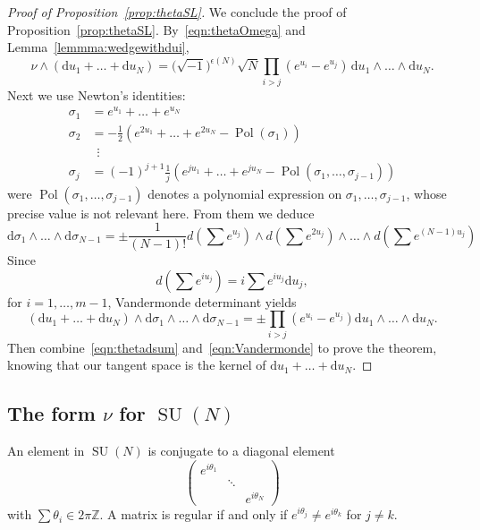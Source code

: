 \documentclass[11pt]{article}
\theoremstyle{definition}
\numberwithin{equation}{section}
\numberwithin{figure}{section}
\numberwithin{table}{section}
\DeclareMathOperator{\SU}{SU}
\DeclareMathOperator{\Pol}{Pol}
\newcommand{\Zbb}{\mathbb{Z}}
\newcommand*{\dd}{\mathrm{d}}
\newcommand{\SUn}{\SU(N)}
\begin{document}
\begin{proof}[Proof of Proposition~\ref{prop:thetaSL}]
We conclude the proof of Proposition~\ref{prop:thetaSL}. By~\eqref{eqn:thetaOmega} and Lemma~\ref{lemmma:wedgewithdui},
\begin{equation}\label{eqn:thetadsum}
\nu\wedge (\dd u_1+\dots + \dd u_N)= \big(\sqrt{-1}\big)^{\epsilon(N)}\sqrt{N} \prod_{i> j}(e^{u_i}-e^{u_j})\, \dd u_1\wedge \dots \wedge \dd u_N.
\end{equation}
Next we use Newton's identities:
\begin{align*}
\sigma_1 & = e^{u_1}+ \dots + e^{u_N} \\
\sigma_2 & = -\tfrac{1}{2} (e^{2 u_1}+ \dots + e^{2 u_N} -\Pol(\sigma_1)) \\
&\;\:\vdots \\
\sigma_j & = (-1)^{j+1}\tfrac{1}{j} (e^{j u_1}+ \dots + e^{j u_N} -\Pol(\sigma_1,\dots,\sigma_{j-1}))
\end{align*}
were $ \Pol(\sigma_1,\dots,\sigma_{j-1})$ denotes a polynomial expression on $\sigma_1,\dots,\sigma_{j-1}$, whose precise value is not relevant here. From them we deduce
\[
\dd\sigma_1\wedge\dots\wedge \dd\sigma_{N-1}= \pm \frac{1}{(N-1)!}d (\sum e^{u_j}) \wedge d (\sum e^{2 u_j})\wedge \dots
\wedge d (\sum e^{(N-1)u_j})
\]
Since
\[
d (\sum e^{i u_j}) = i \sum e^{i u_j}\dd u_ j,
\]
for $i=1,\dots, m-1$, Vandermonde determinant yields
\begin{equation}\label{eqn:Vandermonde}
(\dd u_1+\dots + \dd u_N) \wedge \dd\sigma_1\wedge\dots\wedge \dd\sigma_{N-1} =
\pm \prod_{i>j} (e^{u_i}-e^{u_j}) \dd u_1\wedge \dots \wedge \dd u_N.
\end{equation}
Then combine~\eqref{eqn:thetadsum} and~\eqref{eqn:Vandermonde} to prove the theorem, knowing that our tangent space is the kernel of $ \dd u_1+\dots + \dd u_N $.
\end{proof}


\subsection{The form \texorpdfstring{$\nu$}{nu} for \texorpdfstring{$\SUn$}{SUn}}

An element in $\SUn$ is conjugate to a diagonal element
\[
\begin{pmatrix}
e^{i\theta_1} & & \\
& \ddots & \\
& & e^{i\theta_N}
\end{pmatrix}
\]
with $\sum\theta_i\in 2\pi\Zbb$. A matrix is regular if and only if $e^{i\theta_j}\neq e^{i\theta_k}$ for $j\neq k$.
\end{document}
